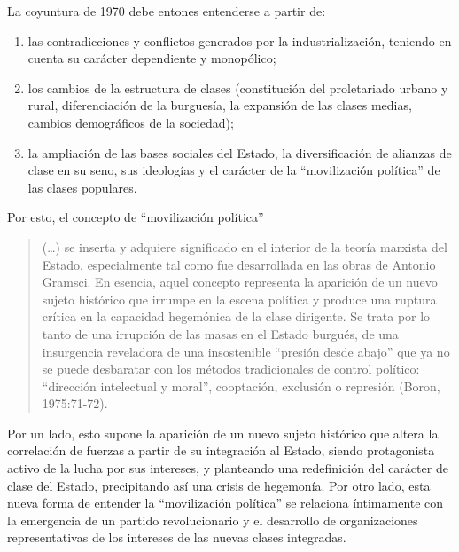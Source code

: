 La coyuntura de 1970 debe entones entenderse a partir de:

\begin{enumerate}
\item las contradicciones y conflictos generados por la industrialización, teniendo en cuenta su carácter dependiente y monopólico;
\item los cambios de la estructura de clases (constitución del proletariado urbano y rural, diferenciación de la burguesía, la expansión de las clases medias, cambios demográficos de la sociedad);
\item la ampliación de las bases sociales del Estado, la diversificación de alianzas de clase en su seno, sus ideologías y el carácter de la \enquote{movilización política} de las clases populares.
\end{enumerate}

Por esto, el concepto de \enquote{movilización política}

\begin{quote}
(\dots) se inserta y adquiere significado en el interior de la teoría marxista del Estado, especialmente tal como fue desarrollada en las obras de Antonio Gramsci. En esencia, aquel concepto representa la aparición de un nuevo sujeto histórico que irrumpe en la escena política y produce una ruptura crítica en la capacidad hegemónica de la clase dirigente. Se trata por lo tanto de una irrupción de las masas en el Estado burgués, de una insurgencia reveladora de una insostenible \enquote{presión desde abajo} que ya no se puede desbaratar con los métodos tradicionales de control político: \enquote{dirección intelectual y moral}, cooptación, exclusión o represión (Boron, 1975:71-72).
\end{quote}

Por un lado, esto supone la aparición de un nuevo sujeto histórico que altera la correlación de fuerzas a partir de su integración al Estado, siendo protagonista activo de la lucha por sus intereses, y planteando una redefinición del carácter de clase del Estado, precipitando así una crisis de hegemonía. Por otro lado, esta nueva forma de entender la \enquote{movilización política} se relaciona íntimamente con la emergencia de un partido revolucionario y el desarrollo de organizaciones representativas de los intereses de las nuevas clases integradas.

